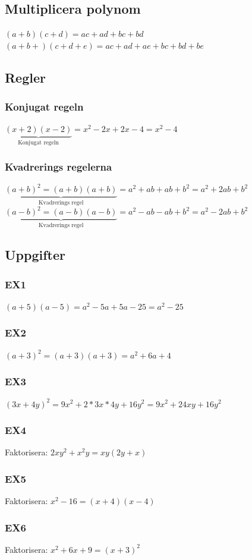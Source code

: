 \documentclass[a4paper,11pt]{article}
\begin{document}
\begin{flushleft}
\subsection{Multiplicera polynom}
$ (a+b)(c+d) = ac+ad+bc+bd $\newline
$ (a+b+)(c+d+e) = ac+ad+ae+bc+bd+be $\newline
\subsection{Regler}
\subsubsection{Konjugat regeln}
$ \underbrace{(x+2)(x-2) }_{\text{Konjugat regeln}} = x^2-2x+2x-4 = x^2-4 $
\subsubsection{Kvadrerings regelerna}
$ \underbrace{(a+b)^2 = (a+b)(a+b) }_{\text{Kvadrerings regel}} = a^2+ab+ab+b^2 = a^2+2ab+b^2 $\newline
$ \underbrace{(a-b)^2 = (a-b)(a-b)}_{\text{Kvadrerings regel}} = a^2-ab-ab+b^2 = a^2-2ab+b^2 $\newline
\subsection{Uppgifter}
\subsubsection{EX1}
$ (a+5)(a-5) = a^2-5a+5a-25=a^2-25 $
\subsubsection{EX2}
$ (a+3)^2 = (a+3)(a+3) = a^2+6a+4 $
\subsubsection{EX3}
$ (3x+4y)^2 = 9x^2+2*3x*4y+16y^2 = 9x^2+24xy+16y^2 $
\subsubsection{EX4}
Faktorisera: $ 2xy^2+x^2y = xy(2y+x) $
\subsubsection{EX5}
Faktorisera: $ x^2-16 = (x+4)(x-4) $
\subsubsection{EX6}
Faktorisera: $ x^2+6x+9 = (x+3)^2 $

\end{flushleft}
\end{document}
